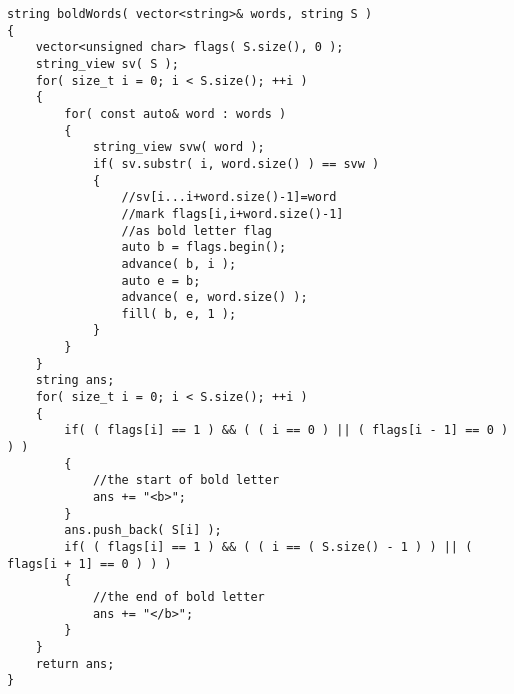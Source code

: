 \setcounter{lstlisting}{0}
\begin{lstlisting}[style=customc, caption={Brute Force}]
string boldWords( vector<string>& words, string S )
{
    vector<unsigned char> flags( S.size(), 0 );
    string_view sv( S );
    for( size_t i = 0; i < S.size(); ++i )
    {
        for( const auto& word : words )
        {
            string_view svw( word );
            if( sv.substr( i, word.size() ) == svw )
            {
                //sv[i...i+word.size()-1]=word
                //mark flags[i,i+word.size()-1]
                //as bold letter flag
                auto b = flags.begin();
                advance( b, i );
                auto e = b;
                advance( e, word.size() );
                fill( b, e, 1 );
            }
        }
    }
    string ans;
    for( size_t i = 0; i < S.size(); ++i )
    {
        if( ( flags[i] == 1 ) && ( ( i == 0 ) || ( flags[i - 1] == 0 ) ) )
        {
            //the start of bold letter
            ans += "<b>";
        }
        ans.push_back( S[i] );
        if( ( flags[i] == 1 ) && ( ( i == ( S.size() - 1 ) ) || ( flags[i + 1] == 0 ) ) )
        {
            //the end of bold letter
            ans += "</b>";
        }
    }
    return ans;
}
\end{lstlisting}